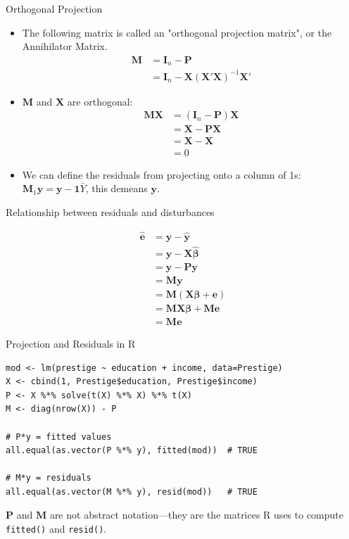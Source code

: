 \documentclass[aspectratio=169, handout]{beamer}
\numberwithin{equation}{section}
\begin{document}
\begin{frame}{Orthogonal Projection}
\begin{itemize}
\item The following matrix is called an "orthogonal projection matrix", or the Annihilator Matrix.
\begin{align*}
\bm{M}&=\bm{I}_n-\bm{P}\\
&=\bm{I}_n-\bm{X}(\bm{X}'\bm{X})^{-1}\bm{X}'
\end{align*}
\item $\bm{M}$ and $\bm{X}$ are orthogonal:
\begin{align*}
\bm{MX}&=(\bm{I}_n-\bm{P})\bm{X}\\
&=\bm{X}-\bm{P}\bm{X}\\
&=\bm{X}-\bm{X}\\
&=0
\end{align*}
\item We can define the residuals from projecting onto a column of 1s: $\bm{M}_1\bm{y}=\bm{y}-\bm{1}\bar{Y}$, this demeans $\bm{y}$.

\end{itemize}
\end{frame}

\begin{frame}{Relationship between residuals and disturbances}

\begin{align*}
\bm{\hat{e}}&=\bm{y}-\bm{\hat{y}}\\
&=\bm{y}-\bm{X\hat{\beta}}\\
&=\bm{y}-\bm{Py}\\
&=\bm{My}\\
&=\bm{M}(\bm{X\beta}+\bm{e})\\
&=\bm{M}\bm{X\beta}+\bm{M}\bm{e}\\
&=\bm{M}\bm{e}
\end{align*}

\end{frame}

\begin{frame}[fragile]{Projection and Residuals in R}
\begin{lstlisting}
mod <- lm(prestige ~ education + income, data=Prestige)
X <- cbind(1, Prestige$education, Prestige$income)
P <- X %*% solve(t(X) %*% X) %*% t(X)
M <- diag(nrow(X)) - P

# P*y = fitted values
all.equal(as.vector(P %*% y), fitted(mod))  # TRUE

# M*y = residuals
all.equal(as.vector(M %*% y), resid(mod))   # TRUE
\end{lstlisting}
\vspace{1ex}
$\bm{P}$ and $\bm{M}$ are not abstract notation---they are the matrices R uses to compute \texttt{fitted()} and \texttt{resid()}.
\end{frame}
\end{document}
